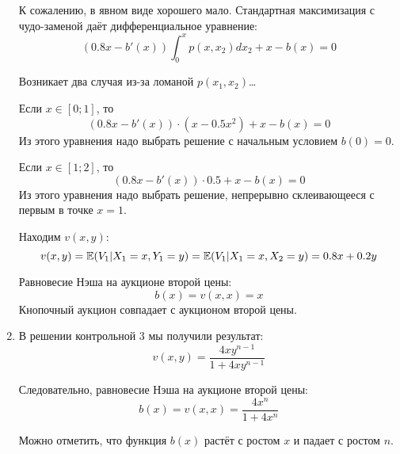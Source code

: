 \begin{enumerate}


К сожалению, в явном виде хорошего мало. Стандартная максимизация с чудо-заменой даёт дифференциальное уравнение:
\begin{equation}
(0.8x-b'(x))\int_{0}^{x}p(x,x_{2})dx_{2}+x-b(x)=0
\end{equation}

Возникает два случая из-за ломаной $ p(x_{1},x_{2}) $\ldots

Если $ x\in [0;1] $, то
\begin{equation}
(0.8x-b'(x))\cdot (x-0.5x^{2})+x-b(x)=0
\end{equation}
Из этого уравнения надо выбрать решение с начальным условием $ b(0)=0 $.

Если $ x\in [1;2] $, то
\begin{equation}
(0.8x-b'(x))\cdot 0.5+x-b(x)=0
\end{equation}
Из этого уравнения надо выбрать решение, непрерывно склеивающееся с первым в точке $x=1$.


Находим $ v(x,y) $:
\begin{equation}
v(x,y)=\operatorname{\mathbb{E}}(V_{1}|X_{1}=x,Y_{1}=y)=\operatorname{\mathbb{E}}(V_{1}|X_{1}=x,X_{2}=y)=0.8x+0.2y
\end{equation}

Равновесие Нэша на аукционе второй цены:
\begin{equation}
b(x)=v(x,x)=x
\end{equation}
Кнопочный аукцион совпадает с аукционом второй цены.


\item В решении контрольной 3 мы получили результат:
\begin{equation}
v(x,y)=\frac{4xy^{n-1}}{1+4xy^{n-1}}
\end{equation}

Следовательно, равновесие Нэша на аукционе второй цены:
\begin{equation}
b(x)=v(x,x)=\frac{4x^{n}}{1+4x^{n}}
\end{equation}

Можно отметить, что функция $b(x)$ растёт с ростом $ x $ и падает с ростом $ n $.


\end{enumerate}
